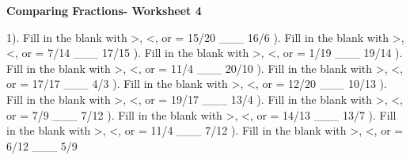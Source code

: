 \documentclass{article}%
\begin{document}
\newline%
\newline%
\pagebreak%
\large%
\begin{center}%
\textbf{Comparing Fractions- Worksheet 4}%
\newline%
\end{center} \normalsize%
1). Fill in the blank with >, <, or = 15/20 \_\_\_ 16/6%
\newline%
\newline%
). Fill in the blank with >, <, or = 7/14 \_\_\_ 17/15%
\newline%
\newline%
). Fill in the blank with >, <, or = 1/19 \_\_\_ 19/14%
\newline%
\newline%
). Fill in the blank with >, <, or = 11/4 \_\_\_ 20/10%
\newline%
\newline%
). Fill in the blank with >, <, or = 17/17 \_\_\_ 4/3%
\newline%
\newline%
). Fill in the blank with >, <, or = 12/20 \_\_\_ 10/13%
\newline%
\newline%
). Fill in the blank with >, <, or = 19/17 \_\_\_ 13/4%
\newline%
\newline%
). Fill in the blank with >, <, or = 7/9 \_\_\_ 7/12%
\newline%
\newline%
). Fill in the blank with >, <, or = 14/13 \_\_\_ 13/7%
\newline%
\newline%
). Fill in the blank with >, <, or = 11/4 \_\_\_ 7/12%
\newline%
\newline%
). Fill in the blank with >, <, or = 6/12 \_\_\_ 5/9%
\newline%
\newline%
\newline%
\end{document}
